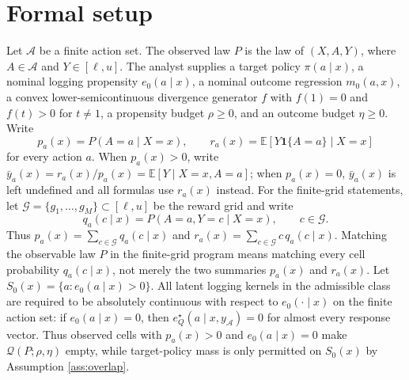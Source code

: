 \documentclass[11pt]{article}
\newcommand{\E}{\mathbb{E}}
\newcommand{\one}{\mathbf{1}}
\theoremstyle{definition}
\theoremstyle{plain}
\theoremstyle{remark}
\begin{document}
\section{Formal setup}
Let $\mathcal{A}$ be a finite action set. The observed law $P$ is the law of $(X,A,Y)$, where $A\in\mathcal{A}$ and $Y\in[\ell,u]$. The analyst supplies a target policy $\pi(a\mid x)$, a nominal logging propensity $e_0(a\mid x)$, a nominal outcome regression $m_0(a,x)$, a convex lower-semicontinuous divergence generator $f$ with $f(1)=0$ and $f(t)>0$ for $t\ne1$, a propensity budget $\rho\ge 0$, and an outcome budget $\eta\ge 0$. Write
\[
  p_a(x)=P(A=a\mid X=x), \qquad
  r_a(x)=\E[Y\one\{A=a\}\mid X=x]
\]
for every action $a$. When $p_a(x)>0$, write $\bar y_a(x)=r_a(x)/p_a(x)=\E[Y\mid X=x,A=a]$; when $p_a(x)=0$, $\bar y_a(x)$ is left undefined and all formulas use $r_a(x)$ instead.
For the finite-grid statements, let $\mathcal G=\{g_1,\ldots,g_M\}\subset[\ell,u]$ be the reward grid and write
\[
  q_a(c\mid x)=P(A=a,Y=c\mid X=x), \qquad c\in\mathcal G .
\]
Thus $p_a(x)=\sum_{c\in\mathcal G}q_a(c\mid x)$ and
$r_a(x)=\sum_{c\in\mathcal G}c\,q_a(c\mid x)$. Matching the observable law $P$ in the finite-grid program means matching every cell probability $q_a(c\mid x)$, not merely the two summaries $p_a(x)$ and $r_a(x)$.
Let $S_0(x)=\{a:e_0(a\mid x)>0\}$. All latent logging kernels in the admissible class are required to be absolutely continuous with respect to $e_0(\cdot\mid x)$ on the finite action set: if $e_0(a\mid x)=0$, then $e_Q^\star(a\mid x,y_{\mathcal A})=0$ for almost every response vector. Thus observed cells with $p_a(x)>0$ and $e_0(a\mid x)=0$ make $\mathcal Q(P;\rho,\eta)$ empty, while target-policy mass is only permitted on $S_0(x)$ by Assumption \ref{ass:overlap}.
\end{document}
